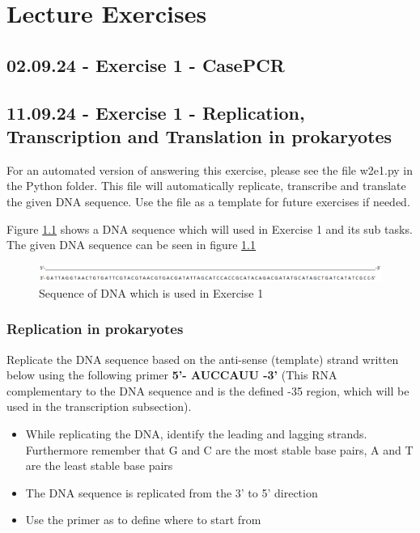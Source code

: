 \chapter{Lecture Exercises}

\section{02.09.24 - Exercise 1 - CasePCR}


\section{11.09.24 - Exercise 1 - Replication, Transcription and Translation in prokaryotes}
For an automated version of answering this exercise, please see the file w2e1.py in the Python folder. This file will automatically replicate, transcribe and translate the given DNA sequence. Use the file as a template for future exercises if needed.

Figure \ref*{fig:Exercise1Seq} shows a DNA sequence which will used in Exercise 1 and its sub tasks. The given DNA sequence can be seen in figure \ref{fig:Exercise1Seq}

\begin{figure}[h]
    \centering  
    \includegraphics[width=1\textwidth]{Figures/Exercise1Seq.png}
    \caption{Sequence of DNA which is used in Exercise 1}
    \label{fig:Exercise1Seq}
\end{figure}
\subsection{Replication in prokaryotes}
Replicate the DNA sequence based on the anti-sense (template) strand written below using the following primer \textbf{5’- AUCCAUU -3’} (This RNA complementary to the DNA sequence and is the defined -35 region, which will be used in the transcription subsection).

\vspace{1em}
\begin{itemize}
    \item While replicating the DNA, identify the leading and lagging strands. Furthermore remember that G and C are the most stable base pairs, A and T are the least stable base pairs
    \item The DNA sequence is replicated from the 3’ to 5’ direction
    \item Use the primer as to define where to start from
\end{itemize} 

